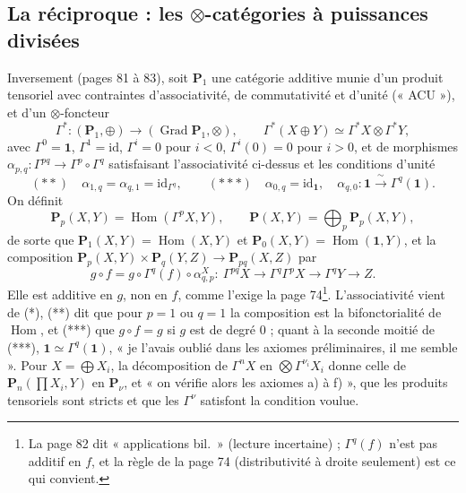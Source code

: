 \documentclass[11pt,a4paper]{article}
\begin{document}
\subsection*{La réciproque : les $\otimes$-catégories à puissances divisées}

Inversement (pages 81 à 83), soit $\mathbf{P}_{1}$ une catégorie additive
munie d'un produit tensoriel avec contraintes d'associativité, de
commutativité et d'unité (« ACU »), et d'un $\otimes$-foncteur
\[
  \Gamma^{*} : (\mathbf{P}_{1}, \oplus) \to (\operatorname{Grad}
  \mathbf{P}_{1}, \otimes), \qquad \Gamma^{*}(X \oplus Y) \simeq
  \Gamma^{*}X \otimes \Gamma^{*}Y,
\]
avec $\Gamma^{0} = \mathbf{1}$, $\Gamma^{1} = \mathrm{id}$, $\Gamma^{i} = 0$
pour $i < 0$, $\Gamma^{i}(0) = 0$ pour $i > 0$, et de morphismes
$\alpha_{p,q} : \Gamma^{pq} \to \Gamma^{p} \circ \Gamma^{q}$ satisfaisant
l'associativité ci-dessus et les conditions d'unité
\[
  (**)\quad \alpha_{1,q} = \alpha_{q,1} = \mathrm{id}_{\Gamma^{q}}, \qquad
  (***)\quad \alpha_{0,q} = \mathrm{id}_{\mathbf{1}}, \quad \alpha_{q,0} :
  \mathbf{1} \xrightarrow{\ \sim\ } \Gamma^{q}(\mathbf{1}).
\]
On définit
\[
  \mathbf{P}_{p}(X, Y) = \operatorname{Hom}(\Gamma^{p}X, Y), \qquad
  \mathbf{P}(X, Y) = \bigoplus_{p} \mathbf{P}_{p}(X, Y),
\]
de sorte que $\mathbf{P}_{1}(X, Y) = \operatorname{Hom}(X, Y)$ et
$\mathbf{P}_{0}(X, Y) = \operatorname{Hom}(\mathbf{1}, Y)$, et la composition
$\mathbf{P}_{p}(X, Y) \times \mathbf{P}_{q}(Y, Z) \to \mathbf{P}_{pq}(X, Z)$
par
\[
  g \circ f = g \circ \Gamma^{q}(f) \circ \alpha^{X}_{q,p} : \ \Gamma^{pq}X
  \to \Gamma^{q}\Gamma^{p}X \to \Gamma^{q}Y \to Z .
\]
Elle est additive en $g$, non en $f$, comme l'exige la page
74\footnote{La page 82 dit « applications bil.\ » (lecture incertaine) ;
$\Gamma^{q}(f)$ n'est pas additif en $f$, et la règle de la page 74 (distributivité à droite
seulement) est ce qui convient.}. L'associativité
vient de (*), (**) dit que pour $p = 1$ ou $q = 1$ la composition est la
bifonctorialité de $\operatorname{Hom}$, et (***) que $g \circ f = g$ si $g$
est de degré $0$ ; quant à la seconde moitié de (***), $\mathbf{1} \simeq
\Gamma^{q}(\mathbf{1})$, « je l'avais oublié dans les axiomes préliminaires,
il me semble ». Pour $X = \bigoplus X_{i}$, la décomposition de
$\Gamma^{n}X$ en $\bigotimes \Gamma^{\nu_{i}}X_{i}$ donne celle de
$\mathbf{P}_{n}(\prod X_{i}, Y)$ en $\mathbf{P}_{\nu}$, et « on vérifie
alors les axiomes a) à f) », que les produits tensoriels sont stricts et que
les $\Gamma^{\nu}$ satisfont la condition voulue.
\end{document}
